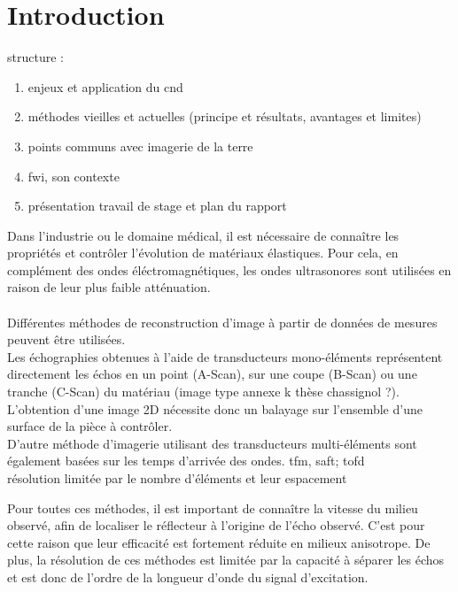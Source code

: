 \chapter{Introduction}

structure :
\begin{enumerate}
	\item enjeux et application du cnd
	\item méthodes vieilles et actuelles (principe et résultats, avantages et limites)
	\item points communs avec imagerie de la terre
	\item fwi, son contexte
	\item présentation travail de stage et plan du rapport
\end{enumerate}



Dans l'industrie ou le domaine médical, il est nécessaire de connaître les propriétés et contrôler l'évolution de matériaux élastiques. Pour cela, en complément des ondes éléctromagnétiques,  les ondes ultrasonores sont utilisées en raison de leur plus faible atténuation.\\~\\


Différentes méthodes de reconstruction d'image à partir de données de mesures peuvent être utilisées.\\

Les échographies obtenues à l'aide de transducteurs mono-éléments représentent directement les échos en un point (A-Scan), sur une coupe (B-Scan) ou une tranche (C-Scan) du matériau (image type annexe k thèse chassignol ?). L'obtention d'une image 2D nécessite donc un balayage sur l'ensemble d'une surface de la pièce à contrôler. \\

D'autre méthode d'imagerie utilisant des transducteurs multi-éléments sont également basées sur les temps d'arrivée des ondes.  tfm, saft; tofd\\
résolution limitée par le nombre d'éléments et leur espacement


Pour toutes ces méthodes, il est important de connaître la vitesse du milieu observé, afin de localiser le réflecteur à l'origine de l'écho observé. C'est pour cette raison que leur efficacité est fortement réduite en milieux anisotrope.  
De plus, la résolution de ces méthodes est limitée par la capacité à séparer les échos et est donc de l'ordre de la longueur d'onde du signal d'excitation. \\


